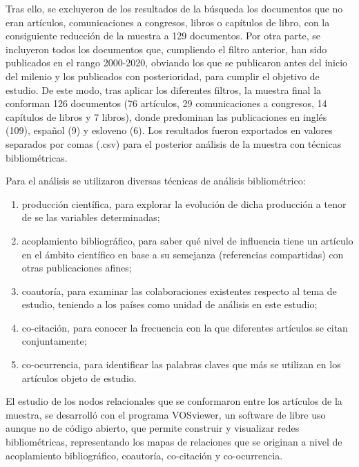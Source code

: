\documentclass[spanish]{textolivre}
\begin{document}
Tras ello, se excluyeron de los resultados de la búsqueda los documentos que no eran artículos, comunicaciones a congresos, libros o capítulos de libro, con la consiguiente reducción de la muestra a 129 documentos. Por otra parte, se incluyeron todos los documentos que, cumpliendo el filtro anterior, han sido publicados en el rango 2000-2020, obviando los que se publicaron antes del inicio del milenio y los publicados con posterioridad, para cumplir el objetivo de estudio. De este modo, tras aplicar los diferentes filtros, la muestra final la conforman 126 documentos (76 artículos, 29 comunicaciones a congresos, 14 capítulos de libros y 7 libros), donde predominan las publicaciones en inglés (109), español (9) y esloveno (6). Los resultados fueron exportados en valores separados por comas (.csv) para el posterior análisis de la muestra con técnicas bibliométricas.

Para el análisis se utilizaron diversas técnicas de análisis bibliométrico: 

\begin{enumerate}
[label=\alph*)]
    \item producción científica, para explorar la evolución de dicha producción a tenor de se las variables determinadas;
    \item acoplamiento bibliográfico, para saber qué nivel de influencia tiene un artículo en el ámbito científico en base a su semejanza (referencias compartidas) con otras publicaciones afines;
    \item coautoría, para examinar las colaboraciones existentes respecto al tema de estudio, teniendo a los países como unidad de análisis en este estudio;
    \item  co-citación, para conocer la frecuencia con la que diferentes artículos se citan conjuntamente;
    \item co-ocurrencia, para identificar las palabras claves que más se utilizan en los artículos objeto de estudio. 
    
\end{enumerate}

El estudio de los nodos relacionales que se conformaron entre los artículos de la muestra, se desarrolló con el programa VOSviewer, un software de libre uso aunque no de código abierto, que permite construir y visualizar redes bibliométricas, representando los mapas de relaciones que se originan a nivel de acoplamiento bibliográfico, coautoría, co-citación y co-ocurrencia.
\end{document}

